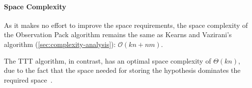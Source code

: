 \paragraph{Space Complexity} As it makes no effort to improve the space
requirements, the space complexity of the Observation Pack algorithm remains the
same as Kearns and Vazirani's algorithm (\cref{sec:complexity-analysis}):
$\mathcal{O}(kn + nm)$.

The TTT algorithm, in contrast, has an optimal space complexity of $\Theta(kn)$,
due to the fact that the space needed for storing the hypothesis dominates the
required space~\cite{Isberner2014b,Isberner2015a}.

